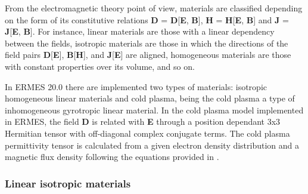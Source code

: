 From the electromagnetic theory point of view, materials are classified depending on the form of its constitutive relations \textbf{D} = \textbf{D}[\textbf{E}, \textbf{B}], \textbf{H} = \textbf{H}[\textbf{E}, \textbf{B}] and \textbf{J} = \textbf{J}[\textbf{E}, \textbf{B}]. For instance, linear materials are those with a linear dependency between the fields, isotropic materials are those in which the directions of the field pairs \textbf{D}[\textbf{E}], \textbf{B}[\textbf{H}], and \textbf{J}[\textbf{E}] are aligned, homogeneous materials are those with constant properties over its volume, and so on. 

In ERMES 20.0 there are implemented two types of materials: isotropic homogeneous linear materials and cold plasma, being the cold plasma a type of inhomogeneous gyrotropic linear material. In the cold plasma model implemented in ERMES, the field \textbf{D} is related with \textbf{E} through a position dependant 3x3 Hermitian tensor with off-diagonal complex conjugate terms. The cold plasma permittivity tensor is calculated from a given electron density distribution and a magnetic flux density following the equations provided in \cite{Swanson}.

\subsubsection{Linear isotropic materials}\label{ILConstitutiveRelations}

